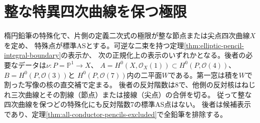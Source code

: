 \section{整な特異四次曲線を保つ極限}
\label{sec:integral-apolar-limits}
\begin{theorem}\label{thm:integral-apolar-alternatives}
楕円鉛筆の特殊化で、片側の定義二次式の極限が整な節点または尖点四次曲線$X$を定め、
特殊点が標準ASとする。可逆な二束を持つ定理\ref{thm:elliptic-pencil-integral-boundary}の表示か、
次の正規化上の表示のいずれかとなる。後者の必要なデータは$\nu:P=\mathbb P^1\to X$、
$A=H^0(X,\mathcal O_X(1))\subset H^0(P,\mathcal O(4))$、$B=H^0(P,\mathcal O(3))$と
$H^0(P,\mathcal O(7))$内の二平面$W$である。第一窓は積を$W$で割った写像の核の直交補で定まる。
後者の反対階数は8で、他側の反対核はねじれ三次曲線とその割線（節点）または接線（尖点）の合併を切る。
従って整な四次曲線を保つどの特殊化にも反対階数7の標準AS点はない。
後者は候補表示であり、定理\ref{thm:all-conductor-pencils-excluded}で全鉛筆を排除する。
\end{theorem}
